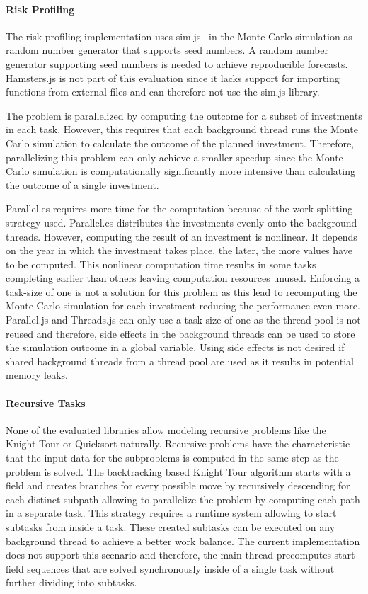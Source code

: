 \paragraph{Risk Profiling}
The risk profiling implementation uses sim.js~\cite{simjs} in the Monte Carlo simulation as random number generator that supports seed numbers. A random number generator supporting seed numbers is needed to achieve reproducible forecasts. Hamsters.js is not part of this evaluation since it lacks support for importing functions from external files and can therefore not use the sim.js library. 

The problem is parallelized by computing the outcome for a subset of investments in each task. However, this requires that each background thread runs the Monte Carlo simulation to calculate the outcome of the planned investment. Therefore, parallelizing this problem can only achieve a smaller speedup since the Monte Carlo simulation is computationally significantly more intensive than calculating the outcome of a single investment.

Parallel.es requires more time for the computation because of the work splitting strategy used. Parallel.es distributes the investments evenly onto the background threads. However, computing the result of an investment is nonlinear. It depends on the year in which the investment takes place, the later, the more values have to be computed. This nonlinear computation time results in some tasks completing earlier than others leaving computation resources unused. Enforcing a task-size of one is not a solution for this problem as this lead to recomputing the Monte Carlo simulation for each investment reducing the performance even more. Parallel.js and Threads.js can only use a task-size of one as the thread pool is not reused and therefore, side effects in the background threads can be used to store the simulation outcome in a global variable. Using side effects is not desired if shared background threads from a thread pool are used as it results in potential memory leaks.

\paragraph{Recursive Tasks} 
None of the evaluated libraries allow modeling recursive problems like the Knight-Tour or Quicksort naturally. Recursive problems have the characteristic that the input data for the subproblems is computed in the same step as the problem is solved. The backtracking based Knight Tour algorithm starts with a field and creates branches for every possible move by recursively descending for each distinct subpath allowing to parallelize the problem by computing each path in a separate task. This strategy requires a runtime system allowing to start subtasks from inside a task. These created subtasks can be executed on any background thread to achieve a better work balance. The current implementation does not support this scenario and therefore, the main thread precomputes start-field sequences that are solved synchronously inside of a single task without further dividing into subtasks.


